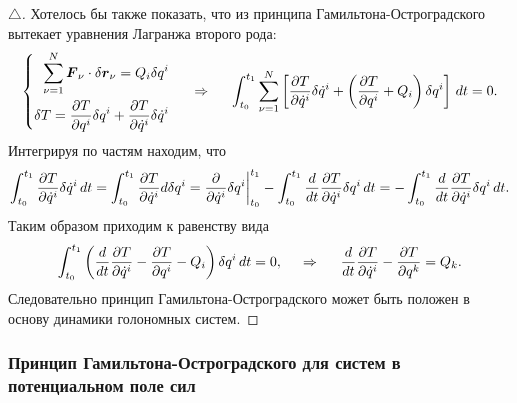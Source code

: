 \begin{proof}[$\triangle$]
    Хотелось бы также показать, что из принципа Гамильтона-Остроградского вытекает уравнения Лагранжа второго рода:
\begin{equation*}
    \left\{\begin{aligned}
        \sum_{\nu=1}^N \mbox{\boldmath $F$}_\nu \cdot \delta \mbox{\boldmath $r$}_\nu = Q_i \delta q^i \\
        \delta T = \frac{\partial T}{\partial q^i} \delta q^i + \frac{\partial T}{\partial \dot{q}^i} \delta \dot{q}^i
    \end{aligned}\right.
    \hspace{0.5cm} \Rightarrow \hspace{0.5cm} 
    \int_{t_0}^{t_1} \sum_{\nu=1}^N 
    \left[
        \frac{\partial T}{\partial \dot{q}^i} \delta \dot{q}^i + \left(
            \frac{\partial T}{\partial q^i} + Q_i
        \right) \delta q^i
    \right] \, d t = 0.
\end{equation*}
Интегрируя по частям находим, что
\begin{equation*}
    \int_{t_0}^{t_1} \frac{\partial T}{\partial \dot{q}^i} \delta \dot{q}^i \, d t 
    = 
    \int_{t_0}^{t_1} \frac{\partial T}{\partial \dot{q}^i} d \delta q^i 
    = 
    \frac{\partial }{\partial \dot{q}^i} \delta q^i \bigg|_{t_0}^{t_1} 
    - \int_{t_0}^{t_1} \frac{d }{d t} \frac{\partial T}{\partial \dot{q}^i} \delta q^i \, d t 
    = 
    - \int_{t_0}^{t_1} \frac{d }{d t} \frac{\partial T}{\partial \dot{q}^i} \delta q^i \, d t.
\end{equation*}
Таким образом приходим к равенству вида
\begin{equation*}
    \int_{t_0}^{t_1} \left(
        \frac{d }{d t} \frac{\partial T}{\partial \dot{q}^i} - \frac{\partial T}{\partial q^i} - Q_i
    \right) \delta q^i \, d t = 0,
    \hspace{0.5cm} \Rightarrow \hspace{0.5cm} 
    \frac{d }{d t} \frac{\partial T}{\partial \dot{q}^i} - \frac{\partial T}{\partial q^k} = Q_k.
\end{equation*}
Следовательно принцип Гамильтона-Остроградского может быть положен в основу динамики голономных систем.
\end{proof}



\subsubsection*{Принцип Гамильтона-Остроградского для систем в потенциальном поле сил}

